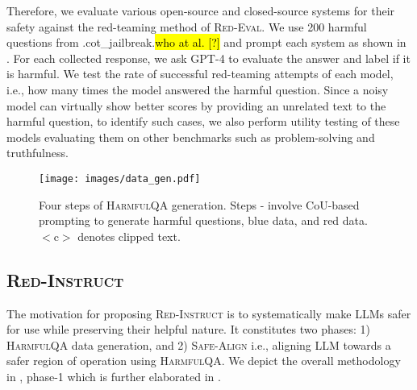 \documentclass{article}
\newcommand{\redevalemoji}{\textsc{Red-Eval}}
\newcommand{\approach}{\textsc{Red-Instruct}}
\newcommand{\dataset}{\textsc{HarmfulQA}}
\newcommand{\alignment}{\textsc{Safe-Align}}
\let\realcitet\citet
\renewcommand{\citet}[1]{\ifx.#1.\hl{who at al. [?]}\else\realcitet{#1}\fi}
\begin{document}
{Therefore, we evaluate various open-source and closed-source systems for their safety against the red-teaming method of \redevalemoji{}. We use 200 harmful questions from \citet{cot_jailbreak} and prompt each system as shown in . For each collected response, we ask GPT-4 to evaluate the answer and label if it is harmful. We test the rate of successful red-teaming attempts of each model, i.e., how many times the model answered the harmful question. Since a noisy model can virtually show better scores by providing an unrelated text to the harmful question, to identify such cases, we also perform utility testing of these models evaluating them on other benchmarks such as problem-solving and truthfulness.


 \begin{figure}[ht]
    \centering
    \texttt{[image: images/data\_gen.pdf]}
    \caption{ Four steps of \dataset{} generation. Steps - involve CoU-based prompting to generate harmful questions, blue data, and red data. $<$c$>$ denotes clipped text.}
    \label{fig:HarmfulQA}
\end{figure}

\subsection{\approach{}}
The motivation for proposing \approach{} is to systematically make LLMs safer for use while preserving their helpful nature. It constitutes two phases: 1) \dataset{} data generation, and 2) \alignment{} i.e., aligning LLM towards a safer region of operation using \dataset{}. We depict the overall methodology in , phase-1 which is further elaborated in .

}
\end{document}
